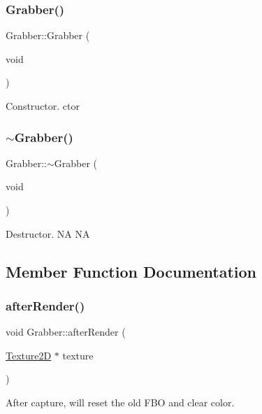 \subsubsection{\texorpdfstring{Grabber()}{Grabber()}\hspace{0.1cm}{\footnotesize\ttfamily [2/2]}}
{\footnotesize\ttfamily Grabber\+::\+Grabber (\begin{DoxyParamCaption}\item[{void}]{ }\end{DoxyParamCaption})}

Constructor.  ctor \mbox{\label{classGrabber_af101dcd8d526aa14315c3f9bbd580b5a}} 
\subsubsection{\texorpdfstring{$\sim$\+Grabber()}{~Grabber()}\hspace{0.1cm}{\footnotesize\ttfamily [2/2]}}
{\footnotesize\ttfamily Grabber\+::$\sim$\+Grabber (\begin{DoxyParamCaption}\item[{void}]{ }\end{DoxyParamCaption})}

Destructor.  NA  NA 

\subsection{Member Function Documentation}
\mbox{\label{classGrabber_a6d97a8b92dce89b0cf96ecffdb704fce}} 
\subsubsection{\texorpdfstring{after\+Render()}{afterRender()}\hspace{0.1cm}{\footnotesize\ttfamily [1/2]}}
{\footnotesize\ttfamily void Grabber\+::after\+Render (\begin{DoxyParamCaption}\item[{\hyperlink{classTexture2D}{Texture2D} $\ast$}]{texture }\end{DoxyParamCaption})}

After capture, will reset the old F\+BO and clear color. \mbox{\label{classGrabber_a6d97a8b92dce89b0cf96ecffdb704fce}} 
